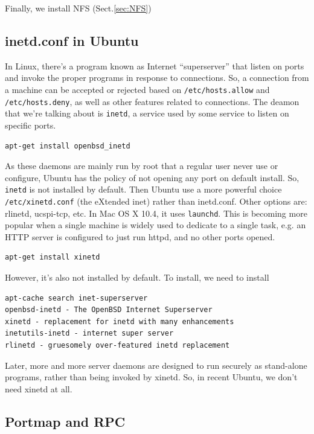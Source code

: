 Finally, we install NFS (Sect.\ref{sec:NFS})

\subsection{inetd.conf in Ubuntu}

In Linux, there's a program known as Internet ``superserver'' that listen on
ports and invoke the proper programs in response to connections. So, a
connection from a machine can be accepted or rejected based on
\verb!/etc/hosts.allow! and \verb!/etc/hosts.deny!, as well as other features
related to connections. The deamon that we're talking about is \verb!inetd!, a
service used by some service to listen on specific ports.

\begin{verbatim}
apt-get install openbsd_inetd 
\end{verbatim}
As these daemons are mainly run by root that a regular user never use or
configure, Ubuntu has the policy of not opening any port on default install.
So, \verb!inetd! is not installed by default. Then Ubuntu use a more powerful
choice \verb!/etc/xinetd.conf! (the eXtended inet) rather than inetd.conf. Other
options are: rlinetd, ucspi-tcp, etc. In Mac OS X 10.4, it uses \verb!launchd!.
This is becoming more popular when a single machine is widely used
to dedicate to a single task, e.g. an HTTP server is configured to just run
httpd, and no other ports opened. 

\begin{verbatim}
apt-get install xinetd
\end{verbatim}

However, it's also not installed by default. To install, we need to
install
\begin{verbatim}
apt-cache search inet-superserver
openbsd-inetd - The OpenBSD Internet Superserver
xinetd - replacement for inetd with many enhancements
inetutils-inetd - internet super server
rlinetd - gruesomely over-featured inetd replacement
\end{verbatim}

Later, more and more server daemons are designed to run securely as stand-alone
programs, rather than being invoked by xinetd. So, in recent Ubuntu, we don't
need xinetd at all. 

\subsection{Portmap and RPC}
\label{sec:portmap_RPC}

